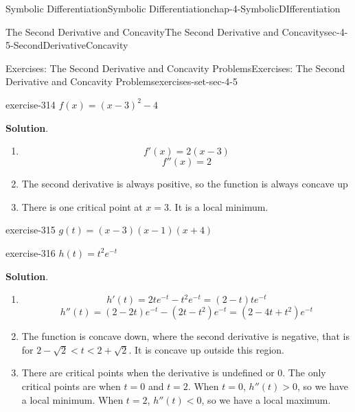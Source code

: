 \documentclass[oneside,10pt,]{book}
\numberwithin{equation}{section}
\newcommand{\lt}{<}
\newcommand{\gt}{>}
\begin{document}
\begin{chapterptx}{Symbolic Differentiation}{}{Symbolic Differentiation}{}{}{chap-4-SymbolicDIfferentiation}
\begin{sectionptx}{The Second Derivative and Concavity}{}{The Second Derivative and Concavity}{}{}{sec-4-5-SecondDerivativeConcavity}
\begin{exercises-subsection-numberless}{Exercises: The Second Derivative and Concavity Problems}{}{Exercises: The Second Derivative and Concavity Problems}{}{}{exercises-set-sec-4-5}
\begin{exercisegroup}
\begin{divisionexerciseeg}{1}{}{}{exercise-314}%
\hypertarget{p-1824}{}%
\(f(x)=(x-3)^2-4\)%
\par\smallskip%
\noindent\textbf{Solution}.\hypertarget{solution-157}{}\quad%
\leavevmode%
\begin{enumerate}[label=(\alph*)]
\item\hypertarget{li-543}{}%
\begin{equation*}
f'(x)=2(x-3)
\end{equation*}
%
\begin{equation*}
f''(x)=2
\end{equation*}
%
\item\hypertarget{li-544}{}\hypertarget{p-1825}{}%
The second derivative is always positive, so the function is always concave up%
\item\hypertarget{li-545}{}\hypertarget{p-1826}{}%
There is one critical point at \(x=3\).  It is a local minimum.%
\end{enumerate}
\end{divisionexerciseeg}%
\begin{divisionexerciseeg}{2}{}{}{exercise-315}%
\hypertarget{p-1827}{}%
\(g(t)=(x-3)(x-1)(x+4)\)%
\end{divisionexerciseeg}%
\begin{divisionexerciseeg}{3}{}{}{exercise-316}%
\hypertarget{p-1828}{}%
\(h(t)=t^2 e^{-t}\)%
\par\smallskip%
\noindent\textbf{Solution}.\hypertarget{solution-158}{}\quad%
\leavevmode%
\begin{enumerate}[label=(\alph*)]
\item\hypertarget{li-546}{}%
\begin{equation*}
h' (t)=2te^{-t}-t^2 e^{-t}=(2-t)te^{-t}
\end{equation*}
%
\begin{equation*}
h'' (t)=(2-2t)e^{-t}-(2t-t^2)e^{-t}=(2-4t+t^2 ) e^{-t}
\end{equation*}
%
\item\hypertarget{li-547}{}\hypertarget{p-1829}{}%
The function is concave down, where the second derivative is negative, that is for \(2-\sqrt{2} \lt t \lt 2+\sqrt{2}\).  It is concave up outside this region.%
\item\hypertarget{li-548}{}\hypertarget{p-1830}{}%
There are critical points when the derivative is undefined or 0. The only critical points are when \(t=0\) and \(t=2\). When \(t=0\), \(h''(t)\gt 0\), so we have a local minimum. When \(t=2\), \(h''(t)\lt 0\), so we have a local maximum.%

\end{enumerate}
\end{divisionexerciseeg}
\end{exercisegroup}
\end{exercises-subsection-numberless}
\end{sectionptx}
\end{chapterptx}
\end{document}
